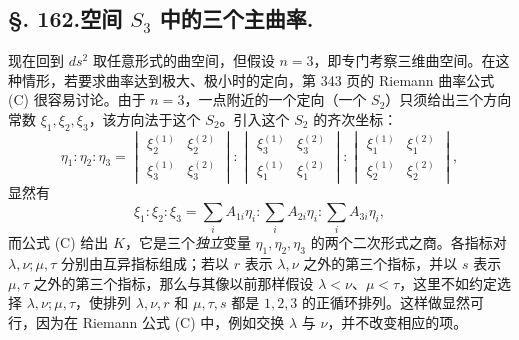 \subsection*{\S. 162.\quad 空间 \(S_3\) 中的三个主曲率.}

现在回到 \(ds^2\) 取任意形式的曲空间，但假设 \(n=3\)，即专门考察三维曲空间。在这种情形，若要求曲率达到极大、极小时的定向，第 343 页的 Riemann 曲率公式 (C) 很容易讨论。由于 \(n=3\)，一点附近的一个定向（一个 \(S_2\)）只须给出三个方向常数 \(\xi_1,\xi_2,\xi_3\)，该方向法于这个 \(S_2\)。引入这个 \(S_2\) 的齐次坐标：
\[
 \eta_1:\eta_2:\eta_3=
 \begin{vmatrix}\xi_2^{(1)}&\xi_2^{(2)}\\\xi_3^{(1)}&\xi_3^{(2)}\end{vmatrix}:
 \begin{vmatrix}\xi_3^{(1)}&\xi_3^{(2)}\\\xi_1^{(1)}&\xi_1^{(2)}\end{vmatrix}:
 \begin{vmatrix}\xi_1^{(1)}&\xi_1^{(2)}\\\xi_2^{(1)}&\xi_2^{(2)}\end{vmatrix},
\]
显然有
\begin{equation}\tag{20}
 \xi_1:\xi_2:\xi_3=
 \sum_iA_{1i}\eta_i:
 \sum_iA_{2i}\eta_i:
 \sum_iA_{3i}\eta_i,
\end{equation}
而公式 (C) 给出 \(K\)，它是三个\emph{独立}变量 \(\eta_1,\eta_2,\eta_3\) 的两个二次形式之商。各指标对 \(\lambda,\nu;\mu,\tau\) 分别由互异指标组成；若以 \(r\) 表示 \(\lambda,\nu\) 之外的第三个指标，并以 \(s\) 表示 \(\mu,\tau\) 之外的第三个指标，那么与其像以前那样假设 \(\lambda<\nu\)、\(\mu<\tau\)，这里不如约定选择 \(\lambda,
\nu;\mu,\tau\)，使排列 \(\lambda,
\nu,r\) 和 \(\mu,
\tau,s\) 都是 \(1,2,3\) 的正循环排列。这样做显然可行，因为在 Riemann 公式 (C) 中，例如交换 \(\lambda\) 与 \(\nu\)，并不改变相应的项。

